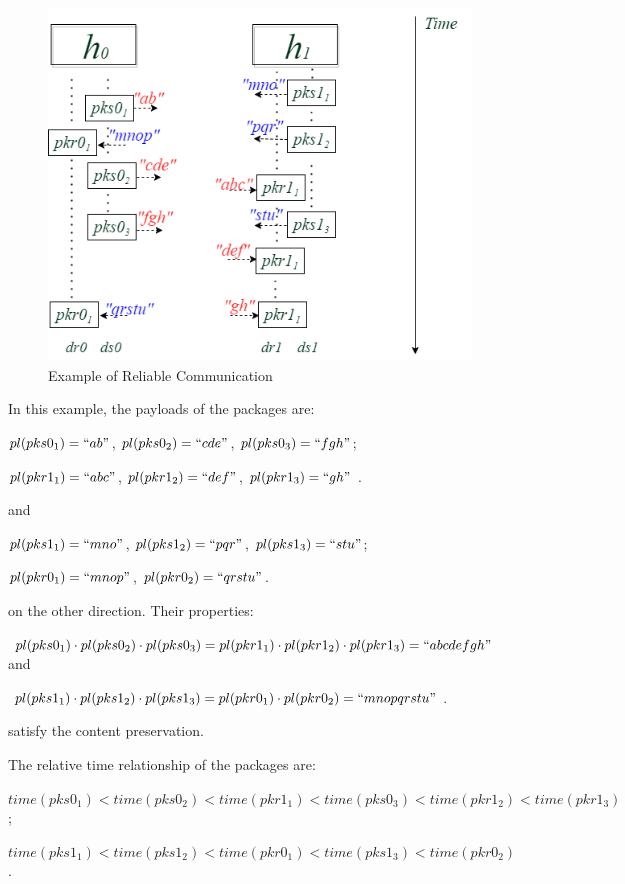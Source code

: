 \begin{figure}[H]
\centerline{\includegraphics[scale=0.55]{Figures/reliableexample}}
\caption{Example of Reliable Communication}
\label{reliableexample}
\end{figure}

In this example, the payloads of the packages are:

$pl(pks0_1)=``ab"$, $ pl(pks0_2)=``cde"$, $pl(pks0_3)=``fgh"$;

$pl(pkr1_1)=``abc"$, $pl(pkr1_2)=``def"$, $pl(pkr1_3)=``gh"$ .

and 

$pl(pks1_1)=``mno"$, $pl(pks1_2)=``pqr"$, $pl(pks1_3)=``stu"$;

$pl(pkr0_1)=``mnop"$, $pl(pkr0_2)=``qrstu"$. 

on the other direction. Their properties:

$pl(pks0_1) \cdot pl(pks0_2) \cdot pl(pks0_3) = pl(pkr1_1) \cdot pl(pkr1_2) \cdot pl(pkr1_3) = ``abcdefgh"$ and 

$pl(pks1_1) \cdot pl(pks1_2) \cdot pl(pks1_3) = pl(pkr0_1) \cdot pl(pkr0_2) = ``mnopqrstu"$. 

satisfy the content preservation. 

The relative time relationship of the packages are: 

$time(pks0_1) < time(pks0_2) < time(pkr1_1)< time(pks0_3) < time(pkr1_2) < time(pkr1_3) $;

$time(pks1_1) < time(pks1_2) < time(pkr0_1)< time(pks1_3) < time(pkr0_2)$. 

